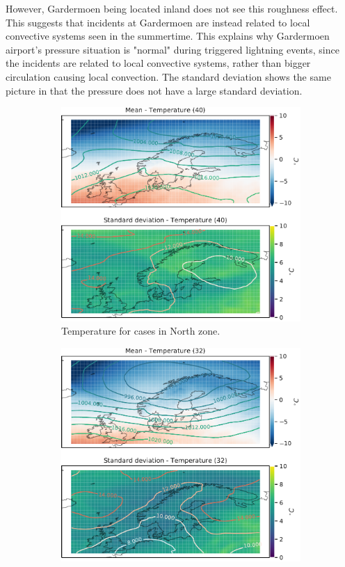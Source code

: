 However, Gardermoen being located inland does not see this roughness effect. This suggests that incidents at Gardermoen are instead related to local convective systems seen in the summertime. This explains why Gardermoen airport's pressure situation is "normal" during triggered lightning events, since the incidents are related to local convective systems, rather than bigger circulation causing local convection. The standard deviation shows the same picture in that the pressure does not have a large standard deviation.

\begin{figure}[H]
\begin{subfigure}[b]{0.49\textwidth}
    \centering
    \includegraphics[width=\textwidth]{Figures/TempNord.pdf}
    \caption{Temperature for cases in North zone.}
    \label{fig:NordTemperature}
\end{subfigure}
\begin{subfigure}[b]{0.49\textwidth}
    \centering
    \includegraphics[width=\textwidth]{Figures/TempNordvest.pdf}

\end{subfigure}
\end{figure}
